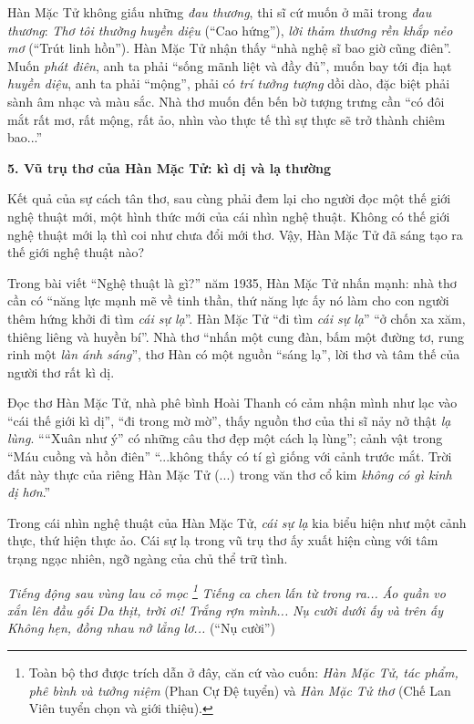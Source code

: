 \documentclass[../main.tex]{subfiles}
\begin{document}
\begin{multicols}{2}
Hàn Mặc Tử không giấu những \textit{đau thương}, thi sĩ cứ muốn ở mãi trong \textit{đau thương}: \textit{Thơ tôi thường huyền diệu} (“Cao hứng”), \textit{lời thảm thương rền khắp nẻo mơ} (“Trút linh hồn”). Hàn Mặc Tử nhận thấy “nhà nghệ sĩ bao giờ cũng điên”. Muốn \textit{phát điên}, anh ta phải “sống mãnh liệt và đầy đủ”, muốn bay tới địa hạt \textit{huyền diệu}, anh ta phải “mộng”, phải có \textit{trí tưởng tượng} dồi dào, đặc biệt phải sành âm nhạc và màu sắc. Nhà thơ muốn đến bến bờ tượng trưng cần “có đôi mắt rất mơ, rất mộng, rất ảo, nhìn vào thực tế thì sự thực sẽ trở thành chiêm bao...” 
 
 
\textbf{5. Vũ trụ thơ của Hàn Mặc Tử: kì dị và lạ thường} 
 
Kết quả của sự cách tân thơ, sau cùng phải đem lại cho người đọc một thế giới nghệ thuật mới, một hình thức mới của cái nhìn nghệ thuật. Không có thế giới nghệ thuật mới lạ thì coi như chưa đổi mới thơ. Vậy, Hàn Mặc Tử đã sáng tạo ra thế giới nghệ thuật nào? 
 
Trong bài viết “Nghệ thuật là gì?” năm 1935, Hàn Mặc Tử nhấn mạnh: nhà thơ cần có “năng lực mạnh mẽ về tinh thần, thứ năng lực ấy nó làm cho con người thêm hứng khởi đi tìm \textit{cái sự lạ}”. Hàn Mặc Tử  “đi tìm \textit{cái sự lạ}” “ở chốn xa xăm, thiêng liêng và huyền bí”. Nhà thơ “nhấn một cung đàn, bấm một đường tơ, rung rinh một \textit{làn ánh sáng}”, thơ Hàn có một nguồn “sáng lạ”, lời thơ và tâm thế của người thơ rất kì dị. 
 
Đọc thơ Hàn Mặc Tử, nhà phê bình Hoài Thanh có cảm nhận mình như lạc vào “cái thế giới kì dị”, “đi trong mờ mờ”, thấy nguồn thơ của thi sĩ nảy nở thật \textit{lạ lùng}. ““Xuân như ý” có những câu thơ đẹp một cách lạ lùng”; cảnh vật trong “Máu cuồng và hồn điên” “...không thấy có tí gì giống với cảnh trước mắt. Trời đất này thực của riêng Hàn Mặc Tử (...) trong văn thơ cổ kim \textit{không có gì kinh dị hơn}.” 
 
Trong cái nhìn nghệ thuật của Hàn Mặc Tử, \textit{cái sự lạ} kia biểu hiện như một cảnh thực, thứ hiện thực ảo. Cái sự lạ trong vũ trụ thơ ấy xuất hiện cùng với tâm trạng ngạc nhiên, ngỡ ngàng của chủ thể trữ tình. 
 
\textit{Tiếng động sau vùng lau cỏ mọc \footnote{
Toàn bộ thơ được trích dẫn ở đây, căn cứ vào cuốn: \textit{Hàn Mặc Tử, tác phẩm, phê bình và tưởng niệm} (Phan Cự Đệ tuyển) và \textit{Hàn Mặc Tử  thơ} (Chế Lan Viên tuyển chọn và giới thiệu).} } 
\textit{Tiếng ca chen lấn từ trong ra...} 
\textit{Áo quần vo xắn lên đầu gối} 
\textit{Da thịt, trời ơi! Trắng rợn mình...} 
\textit{Nụ cười dưới ấy và trên ấy } 
\textit{Không hẹn, đồng nhau nở lẳng lơ...} 
(“Nụ cười”) 
 

\end{multicols}
\end{document}
